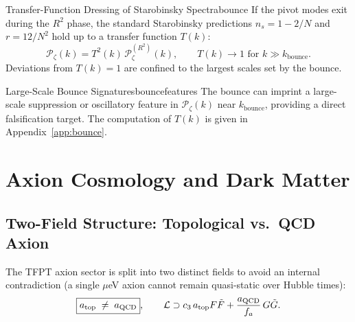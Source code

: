 \begin{theorem}{Transfer-Function Dressing of Starobinsky Spectra}{bounce}
If the pivot modes exit during the $R^2$ phase, the standard Starobinsky
predictions
$n_s = 1 - 2/N$ and $r = 12/N^2$ hold up to a transfer function $T(k)$:
\begin{equation}
    \mathcal{P}_\zeta(k) = T^2(k)\,\mathcal{P}_\zeta^{(R^2)}(k),
    \qquad T(k)\to 1 \text{ for } k \gg k_{\text{bounce}}.
\end{equation}
Deviations from $T(k)=1$ are confined to the largest scales set by the bounce.
\end{theorem}

\begin{corollary}{Large-Scale Bounce Signatures}{bouncefeatures}
The bounce can imprint a large-scale suppression or oscillatory feature in
$\mathcal{P}_\zeta(k)$ near $k_{\text{bounce}}$, providing a direct falsification
target. The computation of $T(k)$ is given in Appendix~\ref{app:bounce}.
\end{corollary}

\section{Axion Cosmology and Dark Matter}

\subsection{Two-Field Structure: Topological vs.\ QCD Axion}

The TFPT axion sector is split into two distinct fields to avoid an internal
contradiction (a single $\mu$eV axion cannot remain quasi-static over Hubble times):
\begin{equation}
    \boxed{a_{\text{top}} \;\neq\; a_{\text{QCD}}},
    \qquad
    \mathcal{L} \supset c_3\, a_{\text{top}} F\tilde{F}
    + \frac{a_{\text{QCD}}}{f_a}\,G\tilde{G}.
\end{equation}

